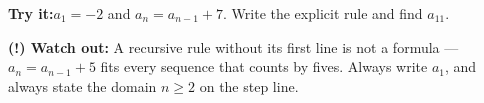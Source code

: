 \documentclass[12pt]{article}
\begin{document}
\begin{tryitbox}
\textbf{Try it:}\quad $a_1 = -2$ and $a_n = a_{n-1} + 7$. Write the explicit
rule and find $a_{11}$.\\[2pt]
\end{tryitbox}

\begin{watchoutbox}
\textbf{(!) Watch out:} A recursive rule without its first line is not a
formula --- $a_n = a_{n-1} + 5$ fits every sequence that counts by fives. Always
write $a_1$, and always state the domain $n \ge 2$ on the step line.
\end{watchoutbox}
\end{document}
